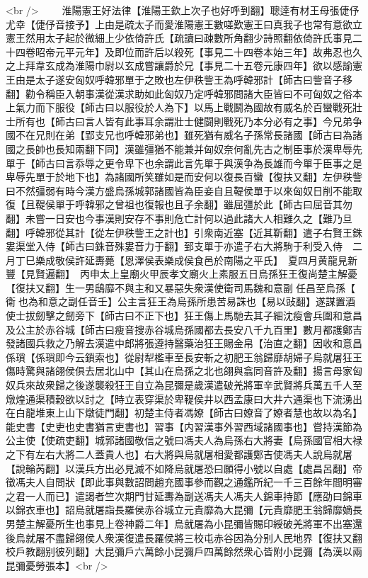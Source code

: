<br />
　　淮陽憲王好法律【淮陽王欽上次子也好呼到翻】聰逹有材王母張倢伃尤幸【倢伃音接予】上由是疏太子而愛淮陽憲王數嗟歎憲王曰真我子也常有意欲立憲王然用太子起於微細上少依倚許氏【疏讀曰疎數所角翻少詩照翻依倚許氏事見二十四卷昭帝元平元年】及即位而許后以殺死【事見二十四卷本始三年】故弗忍也久之上拜韋玄成為淮陽巾尉以玄成嘗讓爵於兄【事見二十五卷元康四年】欲以感諭憲王由是太子遂安匈奴呼韓邪單于之敗也左伊秩訾王為呼韓邪計【師古曰訾音子移翻】勸令稱臣入朝事漢從漢求助如此匈奴乃定呼韓邪問諸大臣皆曰不可匈奴之俗本上氣力而下服役【師古曰以服役於人為下】以馬上戰鬭為國故有威名於百蠻戰死壯士所有也【師古曰言人皆有此事耳余謂壯士健闘則戰死乃本分必有之事】今兄弟争國不在兄則在弟【郢支兄也呼韓邪弟也】雖死猶有威名子孫常長諸國【師古曰為諸國之長帥也長知兩翻下同】漢雖彊猶不能兼并匈奴奈何亂先古之制臣事於漢卑辱先單于【師古曰言忝辱之更令卑下也余謂此言先單于與漢争為長雄而今單于臣事之是卑辱先單于於地下也】為諸國所笑雖如是而安何以復長百蠻【復扶又翻】左伊秩訾曰不然彊弱有時今漢方盛烏孫城郭諸國皆為臣妾自且鞮侯單于以來匈奴日削不能取復【且鞮侯單于呼韓邪之曾祖也復報也且子余翻】雖屈彊於此【師古曰屈音其勿翻】未嘗一日安也今事漢則安存不事則危亡計何以過此諸大人相難久之【難乃旦翻】呼韓邪從其計【從左伊秩訾王之計也】引衆南近塞【近其靳翻】遣子右賢王銖婁渠堂入侍【師古曰銖音殊婁音力于翻】郅支單于亦遣子右大將駒于利受入侍　二月丁巳樂成敬侯許延夀薨【恩澤侯表樂成侯食邑於南陽之平氏】　夏四月黄龍見新豐【見賢遍翻】　丙申太上皇廟火甲辰孝文廟火上素服五日烏孫狂王復尚楚主解憂【復扶又翻】生一男鴟靡不與主和又暴惡失衆漢使衛司馬魏和意副任昌至烏孫【衛也為和意之副任音壬】公主言狂王為烏孫所患苦易誅也【易以䜴翻】遂謀置酒使士拔劒擊之劒旁下【師古曰不正下也】狂王傷上馬馳去其子細沈瘦會兵圍和意昌及公主於赤谷城【師古曰瘦音搜赤谷城烏孫國都去長安八千九百里】數月都護鄭吉發諸國兵救之乃解去漢遣中郎將張遵持醫藥治狂王賜金帛【治直之翻】因收和意昌係瑣【係瑣即今云鎻索也】從尉犁檻車至長安斬之初肥王翁歸靡胡婦子烏就屠狂王傷時驚與諸翖侯俱去居北山中【其山在烏孫之北也翖與翕同音許及翻】揚言母家匈奴兵來故衆歸之後遂襲殺狂王自立為昆彌是歲漢遣破羌將軍辛武賢將兵萬五千人至燉煌通渠積穀欲以討之【時立表穿渠於卑鞮侯井以西孟康曰大井六通渠也下流湧出在白龍堆東上山下燉徒門翻】初楚主侍者馮嫽【師古曰嫽音了嫽者慧也故以為名】能史書【史吏也史書猶言吏書也】習事【内習漢事外習西域諸國事也】嘗持漢節為公主使【使疏吏翻】城郭諸國敬信之號曰馮夫人為烏孫右大將妻【烏孫國官相大禄之下有左右大將二人蓋貴人也】右大將與烏就屠相愛都護鄭吉使馮夫人說烏就屠【說輪芮翻】以漢兵方出必見滅不如降烏就屠恐曰願得小號以自處【處昌呂翻】帝徵馮夫人自問狀【即此事與數詔問趙充國事參而觀之通鑑所紀一千三百餘年間明審之君一人而已】遣謁者竺次期門甘延夀為副送馮夫人馮夫人錦車持節【應劭曰錦車以錦衣車也】詔烏就屠詣長羅侯赤谷城立元貴靡為大昆彌【元貴靡肥王翁歸靡嫡長男楚主解憂所生也事見上卷神爵二年】烏就屠為小昆彌皆賜印綬破羌將軍不出塞還後烏就屠不盡歸翖侯人衆漢復遣長羅侯將三校屯赤谷因為分别人民地界【復扶又翻校戶教翻别彼列翻】大昆彌戶六萬餘小昆彌戶四萬餘然衆心皆附小昆彌【為漢以兩昆彌憂勞張本】<br />
